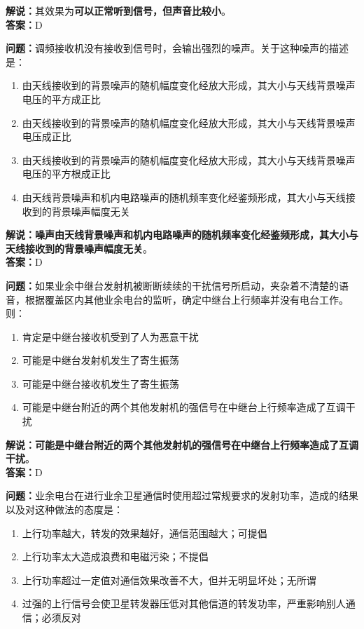 \textbf{解说：}其效果为\textbf{可以正常听到信号，但声音比较小}。\\\textbf{答案：}D


\textbf{问题：}调频接收机没有接收到信号时，会输出强烈的噪声。关于这种噪声的描述是：

\begin{enumerate}[label=\Alph*), leftmargin=1.5cm]
	\item 由天线接收到的背景噪声的随机幅度变化经放大形成，其大小与天线背景噪声电压的平方成正比
	\item 由天线接收到的背景噪声的随机幅度变化经放大形成，其大小与天线背景噪声电压成正比
	\item 由天线接收到的背景噪声的随机幅度变化经放大形成，其大小与天线背景噪声电压的平方根成正比
	\item 由天线背景噪声和机内电路噪声的随机频率变化经鉴频形成，其大小与天线接收到的背景噪声幅度无关
\end{enumerate}

\textbf{解说：噪声由天线背景噪声和机内电路噪声的随机频率变化经鉴频形成，其大小与天线接收到的背景噪声幅度无关}。\\\textbf{答案：}D%


\textbf{问题：}如果业余中继台发射机被断断续续的干扰信号所启动，夹杂着不清楚的语音，根据覆盖区内其他业余电台的监听，确定中继台上行频率并没有电台工作。则：

\begin{enumerate}[label=\Alph*), leftmargin=1.5cm]
	\item 肯定是中继台接收机受到了人为恶意干扰
	\item 可能是中继台发射机发生了寄生振荡
	\item 可能是中继台接收机发生了寄生振荡
	\item 可能是中继台附近的两个其他发射机的强信号在中继台上行频率造成了互调干扰
\end{enumerate}

\textbf{解说：可能是中继台附近的两个其他发射机的强信号在中继台上行频率造成了互调干扰}。\\\textbf{答案：}D%



\textbf{问题：}业余电台在进行业余卫星通信时使用超过常规要求的发射功率，造成的结果以及对这种做法的态度是：

\begin{enumerate}[label=\Alph*), leftmargin=1.5cm]
	\item 上行功率越大，转发的效果越好，通信范围越大；可提倡
	\item 上行功率太大造成浪费和电磁污染；不提倡
	\item 上行功率超过一定值对通信效果改善不大，但并无明显坏处；无所谓
	\item 过强的上行信号会使卫星转发器压低对其他信道的转发功率，严重影响别人通信；必须反对
\end{enumerate}


